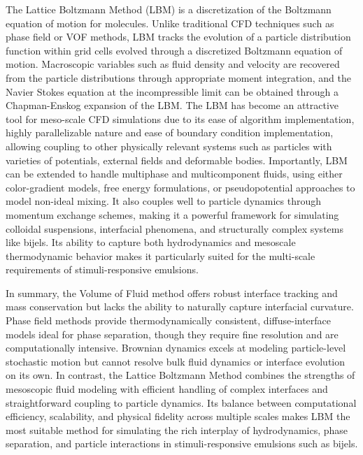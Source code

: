 The Lattice Boltzmann Method (LBM) is a discretization of the Boltzmann equation of motion for molecules. \cite{qian_lattice_1992, succi_lattice_2018, shan_multicomponent_1995, swift_lattice_1996}
Unlike traditional CFD techniques such as phase field or VOF methods, LBM tracks the evolution of a 
particle distribution function within grid cells evolved through a discretized Boltzmann equation of motion. Macroscopic variables such as fluid density and 
velocity are recovered from the particle distributions through appropriate moment integration, and the Navier Stokes equation at the incompressible limit can be 
obtained through a Chapman-Enskog expansion of the LBM. \cite{qian_lattice_1992} The LBM has become an attractive tool for meso-scale CFD simulations due to its ease of algorithm 
implementation, highly parallelizable nature and ease of boundary condition implementation, allowing coupling to other physically relevant systems such as 
particles with varieties of potentials, external fields and deformable bodies. Importantly, LBM can be extended to handle multiphase and multicomponent fluids, using either color-gradient models, free energy formulations, 
or pseudopotential approaches to model non-ideal mixing. It also couples well to particle dynamics through momentum exchange schemes, making it a powerful framework for 
simulating colloidal suspensions, interfacial phenomena, and structurally complex systems like bijels. Its ability to capture both hydrodynamics and mesoscale thermodynamic 
behavior makes it particularly suited for the multi-scale requirements of stimuli-responsive emulsions.

In summary, the Volume of Fluid method offers robust interface tracking and mass conservation but lacks the ability to naturally capture interfacial curvature. 
Phase field methods provide thermodynamically consistent, diffuse-interface models ideal for phase separation, though they require fine resolution and are computationally intensive. 
Brownian dynamics excels at modeling particle-level stochastic motion but cannot resolve bulk fluid dynamics or interface evolution on its own. In contrast, the Lattice Boltzmann Method 
combines the strengths of mesoscopic fluid modeling with efficient handling of complex interfaces and straightforward coupling to particle dynamics. Its balance between computational 
efficiency, scalability, and physical fidelity across multiple scales makes LBM the most suitable method for simulating the rich interplay of hydrodynamics, phase separation, and particle 
interactions in stimuli-responsive emulsions such as bijels.

